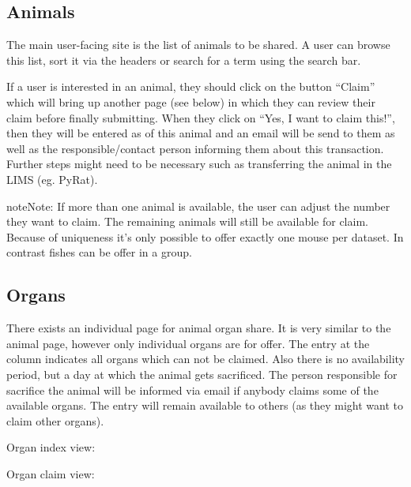 \documentclass[letterpaper,10pt,openany,oneside,english]{sphinxmanual}
\begin{document}
\subsection{Animals}
\label{\detokenize{index:animals}}
The main user-facing site is the list of animals to be shared. A user can browse this list, sort it
via the headers or search for a term using the search bar.

\noindent{}

If a user is interested in an animal, they should click on the button “Claim” which will bring up
another page (see below) in which they can review their claim before finally submitting. When they
click on “Yes, I want to claim this!”, then they will be entered as  of this animal and
an email will be send to them as well as the responsible/contact person informing them about this
transaction. Further steps might need to be necessary such as transferring the animal in the LIMS
(eg. PyRat).

\begin{sphinxadmonition}{note}{Note:}
If more than one animal is available, the user can adjust the number they want to claim.
The remaining animals will still be available for claim. Because of uniqueness it’s only
possible to offer exactly one mouse per dataset. In contrast fishes can be offer in a group.
\end{sphinxadmonition}

\noindent{}


\subsection{Organs}
\label{\detokenize{index:organs}}
There exists an individual page for animal organ share. It is very similar to the animal page,
however only individual organs are for offer. The entry at the column  indicates
all organs which can not be claimed. Also there is no availability period, but a day at
which the animal gets sacrificed. The person responsible for sacrifice the animal will be informed via
email if anybody claims some of the available organs. The entry will remain available to others (as
they might want to claim other organs).

Organ index view:

\noindent{}

Organ claim view:
\end{document}
